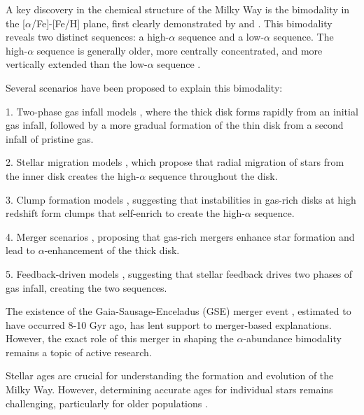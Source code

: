 A key discovery in the chemical structure of the Milky Way is the bimodality in the [$\alpha$/Fe]-[Fe/H] plane, first clearly demonstrated by \citet{2011A&A...535L..11A} and \citet{2012A&A...545A..32A}. This bimodality reveals two distinct sequences: a high-$\alpha$ sequence and a low-$\alpha$ sequence. The high-$\alpha$ sequence is generally older, more centrally concentrated, and more vertically extended than the low-$\alpha$ sequence \citep{2013A&A...560A.109H, 2024IAUS..377..115N}.

Several scenarios have been proposed to explain this bimodality:

1. Two-phase gas infall models \citep{1997ApJ...477..765C, 2009IAUS..254..191C, 2017MNRAS.472.3637G, 2019A&A...623A..60S}, where the thick disk forms rapidly from an initial gas infall, followed by a more gradual formation of the thin disk from a second infall of pristine gas.

2. Stellar migration models \citep{2009MNRAS.396..203S, 2021MNRAS.507.5882S, 2023MNRAS.523.3791C}, which propose that radial migration of stars from the inner disk creates the high-$\alpha$ sequence throughout the disk.

3. Clump formation models \citep{2019MNRAS.484.3476C, 2020MNRAS.492.4716B, 2021MNRAS.502..260B, 2023ApJ...953..128G}, suggesting that instabilities in gas-rich disks at high redshift form clumps that self-enrich to create the high-$\alpha$ sequence.

4. Merger scenarios \citep{2004ApJ...612..894B, 2005ApJ...630..298B, 2007ApJ...658...60B, 2010MNRAS.402.1489R}, proposing that gas-rich mergers enhance star formation and lead to $\alpha$-enhancement of the thick disk.

5. Feedback-driven models \citep{2021MNRAS.501.5176K}, suggesting that stellar feedback drives two phases of gas infall, creating the two sequences.

The existence of the Gaia-Sausage-Enceladus (GSE) merger event \citep{2018MNRAS.478..611B, 2018Natur.563...85H, 2020ApJ...901...48N}, estimated to have occurred 8-10 Gyr ago, has lent support to merger-based explanations. However, the exact role of this merger in shaping the $\alpha$-abundance bimodality remains a topic of active research.


Stellar ages are crucial for understanding the formation and evolution of the Milky Way. However, determining accurate ages for individual stars remains challenging, particularly for older populations \citep{2010ARA&A..48..581S}.

